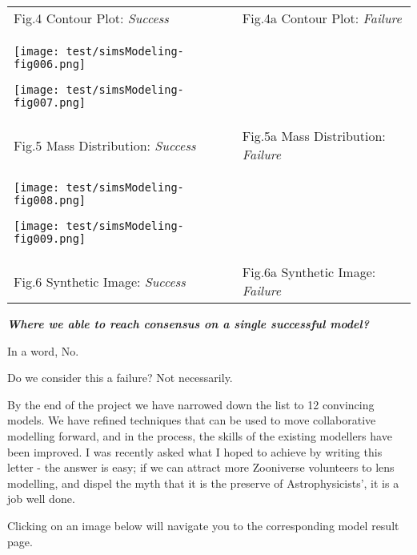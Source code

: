 \documentclass{article}
\begin{document}
\begin{tabular}{|>{\raggedright}p{163pt}|>{\raggedright}p{162pt}|}
\hline
\tabularnewline
\hline
Fig.4 Contour Plot: {\color{color02} \emph{Success}} & Fig.4a Contour Plot: {\color{color02} \emph{Failure}}\tabularnewline
\hline

\texttt{[image: test/simsModeling-fig006.png]}

\texttt{[image: test/simsModeling-fig007.png]}
 & \tabularnewline
\hline
Fig.5 Mass Distribution: {\color{color02} \emph{Success}} & Fig.5a Mass Distribution: 
{\color{color02} \emph{Failure}}\tabularnewline
\hline

\texttt{[image: test/simsModeling-fig008.png]}

\texttt{[image: test/simsModeling-fig009.png]}
 & \tabularnewline
\hline
Fig.6 Synthetic Image: {\color{color02} \emph{Success}} & Fig.6a Synthetic Image: 
{\color{color02} \emph{Failure}}\tabularnewline
\hline
\end{tabular}

\vspace{13pt}
\textbf{\emph{Where we able to reach consensus on a single successful model?}}

In a word, No.

Do we consider this a failure? Not necessarily. 

By the end of the project we have narrowed down the list to 12 convincing models. 
We have refined techniques that can be used to move collaborative modelling forward, 
and in the process, the skills of the existing modellers have been improved. I 
was recently asked what I hoped to achieve by writing this letter - the answer 
is easy; if we can attract more Zooniverse volunteers to lens modelling, and dispel 
the myth that it is the preserve of Astrophysicists', it is a job well done. 

{\small{}Clicking on an image below will navigate you to the corresponding model 
result page.}
\end{document}
